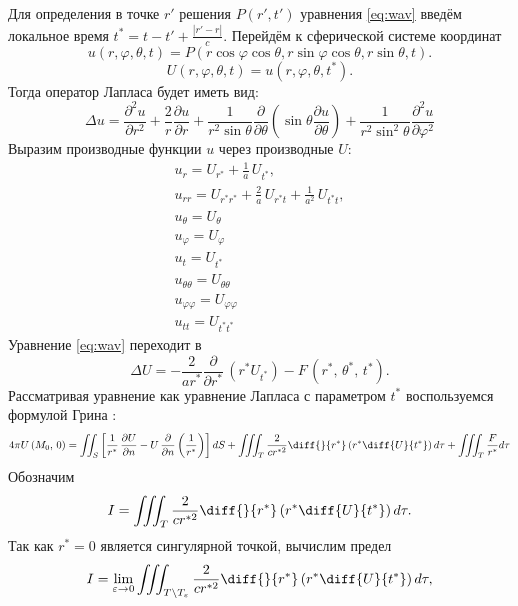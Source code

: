 Для определения в точке $r'$ решения $P(r',t')$ уравнения \ref{eq:wav} введём локальное время $t^* = t - t' + \frac{|r'-r|}{c}$. \cite{samarskii}
Перейдём к сферической системе координат
$$
	u(r,\varphi,\theta,t) = P(r\cos \varphi \cos \theta ,r\sin \varphi \cos \theta,r \sin \theta,t).
$$
$$
	U(r,\varphi,\theta,t) = u(r,\varphi,\theta,t^*).
$$
 Тогда оператор Лапласа будет иметь вид:
\begin{equation}
	\Delta u={\frac{\partial^{2}u}{\partial r^{2}}}+{\frac{2}{r}}{\frac{\partial u}{\partial r}}+{\frac{1}{r^{2}\sin\theta}}{\frac{\partial}{\partial\theta}}\left(\sin\theta{\frac{\partial u}{\partial\theta}}\right)+{\frac{1}{r^{2}\sin^{2}\theta}}{\frac{\partial^{2}u}{\partial\varphi^{2}}}
\end{equation}
Выразим производные функции $u$ через производные $U$:
\begin{gather}
	u_{r}=U_{r^{*}}+{\frac{1}{a}}\,U_{t^{*}}, \\
	u_{r r}=U_{r^{*}r^*}+{\frac{2}{a}}\,U_{r^{*}t}+{\frac{1}{a^{2}}}\,U_{t^{*}t},\\
	u_\theta = U_\theta \\
	u_\varphi = U_\varphi \\
	u_t = U_{t^*} \\
	u_{\theta\theta} = U_{\theta\theta} \\
	u_{\varphi\varphi} = U_{\varphi\varphi} \\
	u_{tt} = U_{t^*t^*} 
\end{gather}
Уравнение \ref{eq:wav} переходит в 
\begin{equation}
	\Delta U=-\frac{2}{a r^{*}}\frac{\partial}{\partial r^{*}}\,(r^{*}U_{t^{*}})-F\,(r^{*},\,\theta^{*},\,t^{*}).
\end{equation}
Рассматривая уравнение как уравнение Лапласа с параметром $t^*$ воспользуемся формулой Грина \cite{samarskii}:
\begin{equation}
	4\pi U\left(M_{0},\,0\right)=\iint_S\left[\frac{1}{r^{\ast}}\,\frac{\partial U}{\partial n}-U\,\frac{\partial}{\partial n}\left(\frac{1}{r^{\ast}}\right)\right]dS + \iiint_T \frac{2}{c r^{*2}} \diff{}{r^*} \left(r^*\diff{U}{t^*}\right) d\tau +
	\iiint_T \frac{F}{r^*} d\tau
\end{equation}
Обозначим $$I = \iiint_T \frac{2}{cr^{*2}} \diff{}{r^*} \left(r^*\diff{U}{t^*}\right) d\tau.$$
Так как $r^*=0$ является сингулярной точкой, вычислим предел
\begin{equation}
	I = \lim\limits_{\varepsilon\to 0} \iiint_{T \setminus T_\varepsilon} \frac{2}{cr^{*2}} \diff{}{r^*} \left(r^*\diff{U}{t^*}\right) d\tau,
\end{equation}
